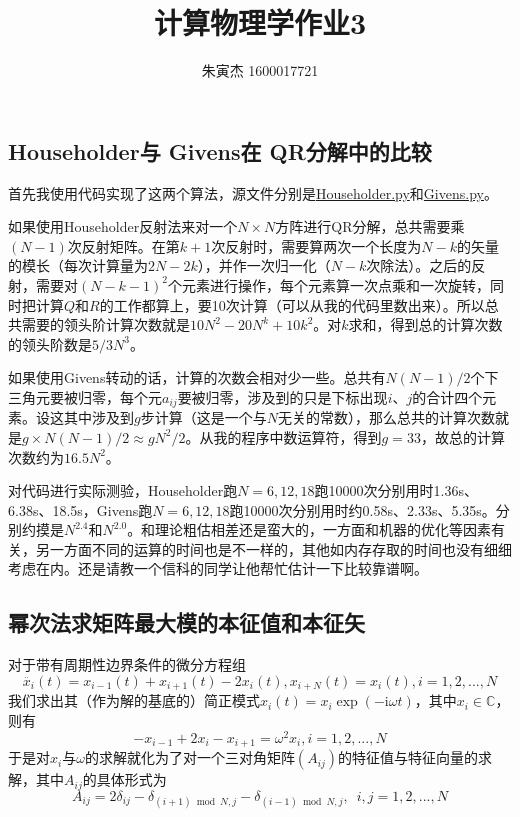 \documentclass[UTF8,size=9.5]{ctexart}
\title{计算物理学作业3}
\author{朱寅杰 1600017721}
\date{}
\begin{document}
\maketitle
\setcounter{section}{3}
\subsection{Householder与 Givens在 QR分解中的比较}
首先我使用代码实现了这两个算法，源文件分别是\href{./Householder.py}{Householder.py}和\href{./Givens.py}{Givens.py}。

如果使用Householder反射法来对一个$N\times N$方阵进行QR分解，总共需要乘$(N-1)$次反射矩阵。在第$k+1$次反射时，需要算两次一个长度为$N-k$的矢量的模长（每次计算量为$2N-2k$），并作一次归一化（$N-k$次除法）。之后的反射，需要对$(N-k-1)^2$个元素进行操作，每个元素算一次点乘和一次旋转，同时把计算$Q$和$R$的工作都算上，要10次计算（可以从我的代码里数出来）。所以总共需要的领头阶计算次数就是$10N^2-20N^k+10k^2$。对$k$求和，得到总的计算次数的领头阶数是$5/3N^3$。

如果使用Givens转动的话，计算的次数会相对少一些。总共有$N(N-1)/2$个下三角元要被归零，每个元$a_{ij}$要被归零，涉及到的只是下标出现$i$、$j$的合计四个元素。设这其中涉及到$g$步计算（这是一个与$N$无关的常数），那么总共的计算次数就是$g\times N(N-1)/2\approx gN^2/2$。从我的程序中数运算符，得到$g=33$，故总的计算次数约为$16.5N^2$。

对代码进行实际测验，Householder跑$N=6,12,18$跑10000次分别用时1.36s、6.38s、18.5s，Givens跑$N=6,12,18$跑10000次分别用时约0.58s、2.33s、5.35s。分别约摸是$N^{2.4}$和$N^{2.0}$。和理论粗估相差还是蛮大的，一方面和机器的优化等因素有关，另一方面不同的运算的时间也是不一样的，其他如内存存取的时间也没有细细考虑在内。还是请教一个信科的同学让他帮忙估计一下比较靠谱啊。
\subsection{幂次法求矩阵最大模的本征值和本征矢}
对于带有周期性边界条件的微分方程组
\[\ddot{x_{i}}(t)=x_{i-1}(t)+x_{i+1}(t)-2x_{i}(t),x_{i+N}(t)=x_{i}(t),i=1,2,...,N\]
我们求出其（作为解的基底的）简正模式$x_i(t)=x_i\exp(-\mathrm{i}\omega t)$，其中$x_i\in \mathds{C}$，则有
\[-x_{i-1}+2x_i-x_{i+1}=\omega^2 x_i,i=1,2,...,N\]
于是对$x_i$与$\omega$的求解就化为了对一个三对角矩阵$(A_{ij})$的特征值与特征向量的求解，其中$A_{ij}$的具体形式为
\[A_{ij}=2\delta_{ij}-\delta_{(i+1)\bmod N,j}-\delta_{(i-1)\bmod N,j},\enspace i,j=1,2,...,N\]
\end{document}
